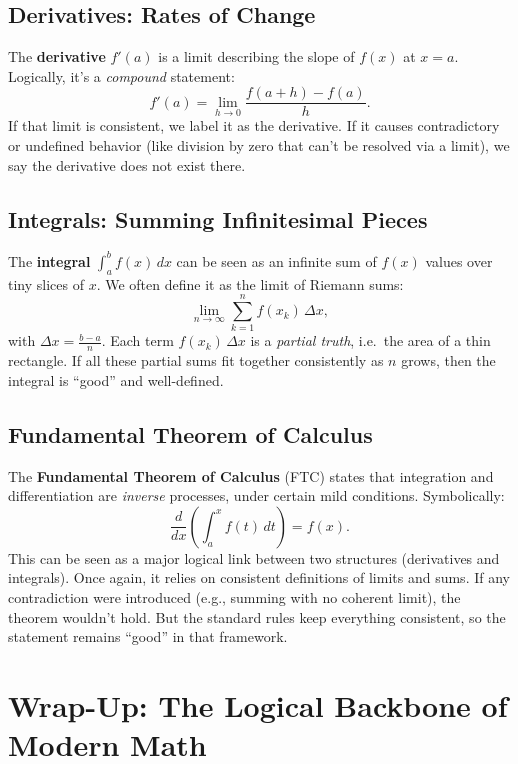 \documentclass[12pt]{article}
\begin{document}
\subsection{Derivatives: Rates of Change}
The \textbf{derivative} $f'(a)$ is a limit describing the slope of
$f(x)$ at $x=a$. Logically, it's a \emph{compound} statement: 
\[
f'(a) = \lim_{h \to 0} \frac{f(a+h) - f(a)}{h}.
\]
If that limit is consistent, we label it as the derivative. If it
causes contradictory or undefined behavior (like division by zero
that can't be resolved via a limit), we say the derivative does not
exist there.

\subsection{Integrals: Summing Infinitesimal Pieces}
The \textbf{integral} $\int_a^b f(x)\,dx$ can be seen as an infinite
sum of $f(x)$ values over tiny slices of $x$. We often define it as
the limit of Riemann sums:
\[
\lim_{n\to\infty} \sum_{k=1}^{n} f(x_k)\,\Delta x,
\]
with $\Delta x = \frac{b-a}{n}$. Each term $f(x_k)\,\Delta x$ is a
\emph{partial truth}, i.e.\ the area of a thin rectangle. If all these
partial sums fit together consistently as $n$ grows, then the integral
is ``good'' and well-defined. 

\subsection{Fundamental Theorem of Calculus}
The \textbf{Fundamental Theorem of Calculus} (FTC) states that
integration and differentiation are \emph{inverse} processes, under
certain mild conditions. Symbolically:
\[
\frac{d}{dx} \left( \int_{a}^{x} f(t)\,dt \right) = f(x).
\]
This can be seen as a major logical link between two structures
(derivatives and integrals). Once again, it relies on consistent
definitions of limits and sums. If any contradiction were introduced
(e.g., summing with no coherent limit), the theorem wouldn't hold. 
But the standard rules keep everything consistent, so the statement
remains ``good'' in that framework.

\section{Wrap-Up: The Logical Backbone of Modern Math}
\end{document}
